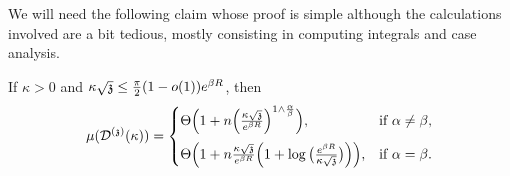 %
We will need the following claim whose proof is simple although the calculations involved are a bit tedious, mostly consisting in 
computing integrals and case analysis. 
\begin{lemma}\label{lem:angular-muDt}
If $\kappa>0$ and $\kappa\sqrt{\ss}\leq \frac{\pi}{2}(1-o(1))e^{\beta R}$, then
\[
\mu(\dt(\kappa))=
\begin{cases}
\Theta\Big(\mkor{\nu}{1}+n\Big(\frac{\kappa\sqrt{\ss}}{e^{\beta R}}\Big)^{1\wedge \frac{\alpha}{\beta}}\Big),
& \text{if $\alpha\neq\beta$,} \\[8pt]
\Theta\Big(\mkor{\nu}{1}+n\frac{\kappa\sqrt{\ss}}{e^{\beta R}}\Big(1+\log\big(\frac{e^{\beta R}}{\kappa\sqrt{\ss}}\big)\Big)\Big),
& \text{if $\alpha=\beta$.}
\end{cases}
\]
\end{lemma}
